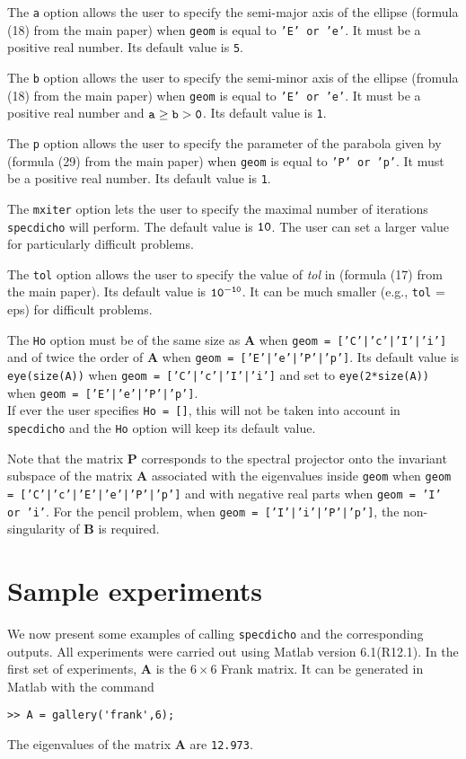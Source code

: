 \documentclass[acmtocl]{acmtrans2m}
\newcommand{\Am}{\mathbf{A}}
\newcommand{\Bm}{\mathbf{B}}
\newcommand{\Pm}{\mathbf{P}}
\begin{document}
The {\tt  a} option allows the user to specify the semi-major axis of the ellipse (formula (18) from the main paper) when {\tt geom} is equal to {\tt 'E' or 'e'}.
It must be a positive real number.
Its default value is {\tt 5}.

The {\tt  b} option  allows the user to specify the semi-minor axis of the ellipse (fromula (18) from the main paper) when {\tt geom} is equal to {\tt 'E' or 'e'}.
It must be a positive real number and  ${\tt a \ge b >0}$.
Its default value is {\tt 1}.

The {\tt  p} option allows the user to specify the parameter of the parabola given by (formula (29) from the main paper) when {\tt geom} is equal to {\tt 'P' or 'p'}.
It must be a positive real number.
Its default value is {\tt 1}.

The {\tt  mxiter} option lets the user to specify the maximal number of iterations {\tt specdicho} will perform.
The default value is ${\tt 10}$.
The user can set a larger value for particularly difficult problems.

The {\tt tol} option allows the user to specify the value of {\it tol} in (formula (17) from the main paper).
Its default value is ${\tt 10^{-10}}$.
It can be much smaller (e.g., {\tt tol} = eps) for difficult problems.

The {\tt  Ho} option  must be of the same size as $\Am$ when {\tt geom = ['C'|'c'|'I'|'i']}  and of twice the order of $\Am$ when {\tt geom = ['E'|'e'|'P'|'p']}.
Its default value is {\tt  eye(size(A))} when {\tt geom = ['C'|'c'|'I'|'i']} and  set to {\tt  eye(2*size(A))} when {\tt geom = ['E'|'e'|'P'|'p']}.\\
If ever the user specifies {\tt Ho = []}, this will not be taken into account in {\tt specdicho} and the {\tt Ho} option will keep its default value.

Note that the matrix $\Pm$ corresponds to the spectral projector onto the invariant subspace of the matrix $\Am$ associated with the eigenvalues inside {\tt geom} when {\tt geom = ['C'|'c'|'E'|'e'|'P'|'p']} and with negative real parts when {\tt geom = 'I' or 'i'}.
For the pencil problem, when {\tt geom = ['I'|'i'|'P'|'p']}, the non-singularity of $\Bm$ is required.
\section{Sample experiments}\label{sec5}
We now present some examples of calling {\tt specdicho} and the corresponding outputs.
All experiments were carried out using {\sc Matlab} version 6.1(R12.1).
In the first set of experiments, $\Am$ is the $6 \times 6$ Frank matrix.
It can be generated in {\sc Matlab} with the command
\begin{verbatim}
>> A = gallery('frank',6);
\end{verbatim}
The eigenvalues of the matrix $\Am$ are {\tt 12.973}.
\end{document}
